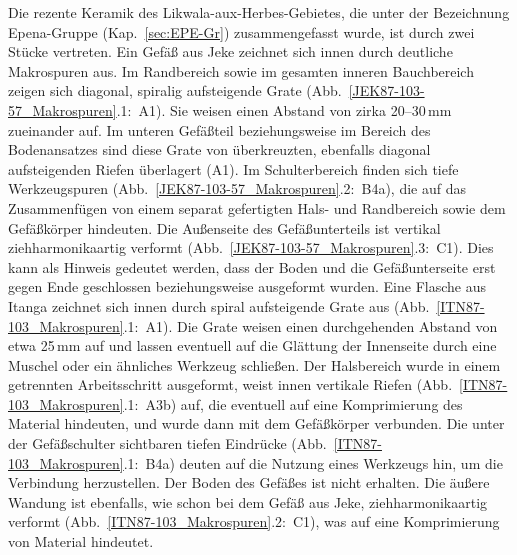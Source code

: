 Die rezente Keramik des Likwala-aux-Herbes-Gebietes, die unter der Bezeichnung Epena-Gruppe (Kap.~\ref{sec:EPE-Gr}) zusammengefasst wurde, ist durch zwei Stücke vertreten. Ein Gefäß aus Jeke zeichnet sich innen durch deutliche Makrospuren aus. Im Randbereich sowie im gesamten inneren Bauchbereich zeigen sich diagonal, spiralig aufsteigende Grate (Abb.~\ref{JEK87-103-57_Makrospuren}.1:~A1). Sie weisen einen Abstand von zirka 20--30\,mm zueinander auf. Im unteren Gefäßteil beziehungsweise im Bereich des Bodenansatzes sind diese Grate von überkreuzten, ebenfalls diagonal aufsteigenden Riefen überlagert (A1). Im Schulterbereich finden sich tiefe Werkzeugspuren (Abb.~\ref{JEK87-103-57_Makrospuren}.2:~B4a), die auf das Zusammenfügen von einem separat gefertigten Hals- und Randbereich sowie dem Gefäßkörper hindeuten. Die Außenseite des Gefäßunterteils ist vertikal ziehharmonikaartig verformt (Abb.~\ref{JEK87-103-57_Makrospuren}.3:~C1). Dies kann als Hinweis gedeutet werden, dass der Boden und die Gefäßunterseite erst gegen Ende geschlossen beziehungsweise ausgeformt wurden. Eine Flasche aus Itanga zeichnet sich innen durch spiral aufsteigende Grate aus (Abb.~\ref{ITN87-103_Makrospuren}.1:~A1). Die Grate weisen einen durchgehenden Abstand von etwa 25\,mm auf und lassen eventuell auf die Glättung der Innenseite durch eine Muschel oder ein ähnliches Werkzeug schließen. Der Halsbereich wurde in einem getrennten Arbeitsschritt ausgeformt, weist innen vertikale Riefen (Abb.~\ref{ITN87-103_Makrospuren}.1:~A3b) auf, die eventuell auf eine Komprimierung des Material hindeuten, und wurde dann mit dem Gefäßkörper verbunden. Die unter der Gefäßschulter sichtbaren tiefen Eindrücke (Abb.~\ref{ITN87-103_Makrospuren}.1:~B4a) deuten auf die Nutzung eines Werkzeugs hin, um die Verbindung herzustellen. Der Boden des Gefäßes ist nicht erhalten. Die äußere Wandung ist ebenfalls, wie schon bei dem Gefäß aus Jeke, ziehharmonikaartig verformt (Abb.~\ref{ITN87-103_Makrospuren}.2:~C1), was auf eine Komprimierung von Material hindeutet.

